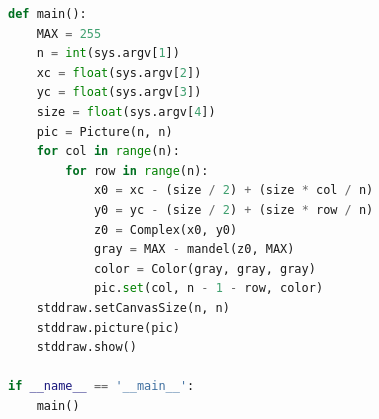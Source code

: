 \documentclass[8pt,a4paper,compress]{beamer}
\begin{document}
\begin{frame}[fragile]
\pause

\begin{lstlisting}[language=python,style=focusin]
def main():
    MAX = 255
    n = int(sys.argv[1])
    xc = float(sys.argv[2])
    yc = float(sys.argv[3])
    size = float(sys.argv[4])
    pic = Picture(n, n)
    for col in range(n):
        for row in range(n):
            x0 = xc - (size / 2) + (size * col / n)
            y0 = yc - (size / 2) + (size * row / n)
            z0 = Complex(x0, y0)
            gray = MAX - mandel(z0, MAX)
            color = Color(gray, gray, gray)
            pic.set(col, n - 1 - row, color)
    stddraw.setCanvasSize(n, n)
    stddraw.picture(pic)
    stddraw.show()

if __name__ == '__main__':
    main()
\end{lstlisting}
\end{frame}
\end{document}
